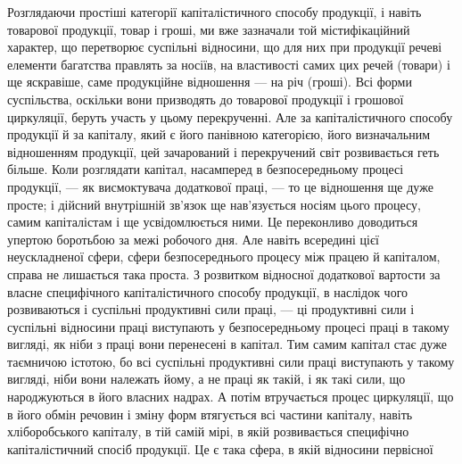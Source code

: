 Розглядаючи простіші категорії капіталістичного способу продукції, і навіть
товарової продукції, товар і гроші, ми вже зазначали той містифікаційний
характер, що перетворює суспільні відносини, що для них при продукції речеві
елементи багатства правлять за носіїв, на властивості самих цих речей (товари)
і ще яскравіше, саме продукційне відношення — на річ (гроші). Всі форми
суспільства, оскільки вони призводять до товарової продукції і грошової циркуляції,
беруть участь у цьому перекрученні. Але за капіталістичного способу
продукції й за капіталу, який є його панівною категорією, його визначальним
відношенням продукції, цей зачарований і перекручений світ розвивається геть
більше. Коли розглядати капітал, насамперед в безпосередньому процесі продукції,
— як висмоктувача додаткової праці, — то це відношення ще дуже просте;
і дійсний внутрішній зв’язок ще нав’язується носіям цього процесу, самим
капіталістам і ще усвідомлюється ними. Це переконливо доводиться упертою
боротьбою за межі робочого дня. Але навіть всередині цієї неускладненої сфери,
сфери безпосереднього процесу між працею й капіталом, справа не лишається
така проста. З розвитком відносної додаткової вартости за власне специфічного
капіталістичного способу продукції, в наслідок чого розвиваються і суспільні
продуктивні сили праці, — ці продуктивні сили і суспільні відносини праці виступають
у безпосередньому процесі праці в такому вигляді, як ніби з праці
вони перенесені в капітал. Тим самим капітал стає дуже таємничою істотою,
бо всі суспільні продуктивні сили праці виступають у такому вигляді,
ніби вони належать йому, а не праці як такій, і як такі сили, що народжуються
в його власних надрах. А потім втручається процес циркуляції, що
в його обмін речовин і зміну форм втягується всі частини капіталу, навіть
хліборобського капіталу, в тій самій мірі, в якій розвивається специфічно
капіталістичний спосіб продукції. Це є така сфера, в якій відносини первісної
\parbreak{}  %
